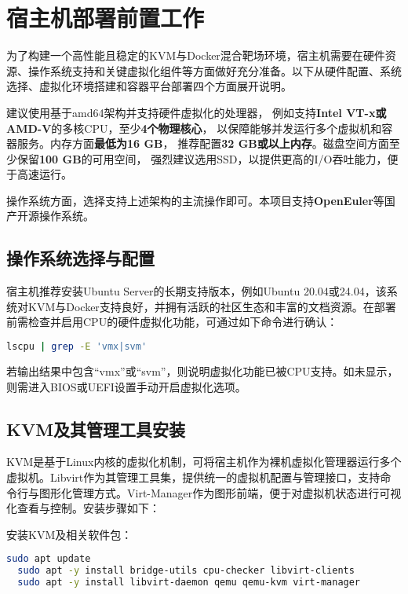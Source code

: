 \documentclass[lang=cn,10pt]{elegantbook}
\begin{document}
\section{宿主机部署前置工作}

为了构建一个高性能且稳定的KVM与Docker混合靶场环境，宿主机需要在硬件资源、操作系统支持和关键虚拟化组件等方面做好充分准备。以下从硬件配置、系统选择、虚拟化环境搭建和容器平台部署四个方面展开说明。

\begin{proposition}
  建议使用基于amd64架构并支持硬件虚拟化的处理器，
  例如支持\textbf{Intel VT-x或AMD-V}的多核CPU，至少\textbf{4个物理核心}，
  以保障能够并发运行多个虚拟机和容器服务。内存方面\textbf{最低为16 GB}，
  推荐配置\textbf{32 GB或以上内存}。磁盘空间方面至少保留\textbf{100 GB}的可用空间，
  强烈建议选用SSD，以提供更高的I/O吞吐能力，便于高速运行。
  
  操作系统方面，选择支持上述架构的主流操作即可。本项目支持\textbf{OpenEuler}等国产开源操作系统。
\end{proposition}


\subsection{操作系统选择与配置}

宿主机推荐安装Ubuntu Server的长期支持版本，例如Ubuntu 20.04或24.04，该系统对KVM与Docker支持良好，并拥有活跃的社区生态和丰富的文档资源。在部署前需检查并启用CPU的硬件虚拟化功能，可通过如下命令进行确认：


\begin{lstlisting}[language=bash]
  lscpu | grep -E 'vmx|svm'
\end{lstlisting}

若输出结果中包含“vmx”或“svm”，则说明虚拟化功能已被CPU支持。如未显示，则需进入BIOS或UEFI设置手动开启虚拟化选项。

\subsection{KVM及其管理工具安装}

KVM是基于Linux内核的虚拟化机制，可将宿主机作为裸机虚拟化管理器运行多个虚拟机。Libvirt作为其管理工具集，提供统一的虚拟机配置与管理接口，支持命令行与图形化管理方式。Virt-Manager作为图形前端，便于对虚拟机状态进行可视化查看与控制。安装步骤如下：

安装KVM及相关软件包：

\begin{lstlisting}[language=bash]
  sudo apt update
  sudo apt -y install bridge-utils cpu-checker libvirt-clients 
  sudo apt -y install libvirt-daemon qemu qemu-kvm virt-manager
\end{lstlisting}
\end{document}
